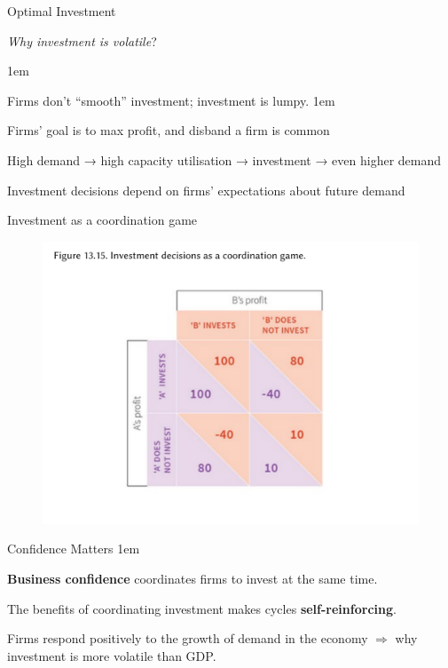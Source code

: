 \documentclass[11pt,aspectratio=43,usenames,dvipsnames]{beamer}
\let\olditemize=\itemize
\let\endolditemize=\enditemize
\renewenvironment{itemize}{\olditemize \itemsep1em}{\endolditemize}
\theoremstyle{definition}
\begin{document}
\begin{frame}{Optimal Investment}
\label{slide:Optimal_Investment}
    \begin{center}
        \textit{Why investment is volatile}?
    \end{center}
    \begin{itemize}
        \item Firms don't ``smooth'' investment; investment is \alert{lumpy}.
        \begin{itemize}
            \item Firms' goal is to max profit, and disband a firm is common
        \end{itemize}
        \item High demand → high capacity utilisation → investment → even higher demand
        \item Investment decisions depend on firms' expectations about future demand
    \end{itemize}
\end{frame}

\begin{frame}{Investment as a coordination game}
\label{slide:Investment_as_a_coordination_game}
    \begin{figure}
        \centering
        \includegraphics[width=\textwidth]{./figures/11.pdf}
    \end{figure}
\end{frame}

\begin{frame}{Confidence Matters}
\label{slide:Confidence_Matters}
    \begin{itemize}
        \item \textbf{Business confidence} coordinates firms to invest at the same time.
        \item The benefits of \alert{coordinating investment} makes cycles \textbf{self-reinforcing}.
        \item Firms respond positively to the growth of demand in the economy $ \Rightarrow  $ why investment is more volatile than GDP.
    \end{itemize}


\end{frame}
\end{document}
